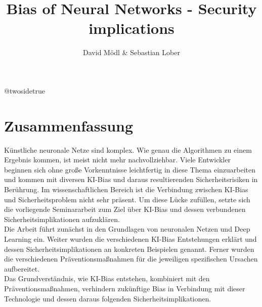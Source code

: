 \documentclass[12pt,oneside,a4paper,parskip]{scrbook}
\makeatletter
\def\BaAuthorStudyProgram{Informatik} %
\def\BaType{Seminararbeit} %
\def\BaTitle{Bias of Neural Networks - Security implications}
\def\BaSupervisorOne{Prof.\ Dr.\ A B}
\def\BaSupervisorTwo{Prof.\ Dr.\ C D}
\def\BaDeadline{\today}
\newcommand*{\forcetwosidetitle}[1][1]{%
 \begingroup
   \cleardoubleoddpage
   \KOMAoptions{titlepage=true}%
   \csname @twosidetrue\endcsname
   \maketitle[{#1}]
 \endgroup
}
\makeatother
\begin{document}


\frontmatter
\titlehead{%
  {Hochschule für angewandte Wissenschaften Würzburg-Schweinfurt\\
   Fakultät Informatik und Wirtschaftsinformatik}}
\subject{\BaType}
\title{\BaTitle\\[15mm]}
\author{David Mödl \& Sebastian Lober}
\forcetwosidetitle



\section*{Zusammenfassung}
Künstliche neuronale Netze sind komplex. Wie genau die Algorithmen zu einem Ergebnis kommen, ist meist nicht mehr nachvollziehbar. Viele Entwickler beginnen  sich ohne große Vorkenntnisse leichtfertig in diese Thema einzuarbeiten und kommen mit diversen KI-Bias und daraus resultierenden Sicherheitsrisiken in Berührung. Im wissenschaftlichen Bereich ist die Verbindung zwischen KI-Bias und Sicherheitsproblem nicht sehr präsent. Um diese Lücke zufüllen, setzte sich die vorliegende Seminararbeit zum Ziel über KI-Bias und dessen verbundenen Sicherheitsimplikationen aufzuklären.\\
Die Arbeit führt zunächst in den Grundlagen von neuronalen Netzen und Deep Learning ein. Weiter wurden die verschiedenen KI-Bias Entstehungen erklärt und dessen Sicherheitsimplikationen an konkreten Beispielen genannt. Ferner wurden die verschiedenen Präventionsmaßnahmen für die jeweiligen spezifischen Ursachen aufbereitet.\\
Das Grundverständnis, wie KI-Bias entstehen, kombiniert mit den Präventionsmaßnahmen, verhindern zukünftige Bias in Verbindung mit dieser Technologie und dessen daraus folgenden Sicherheitsimplikationen.
\end{document}
